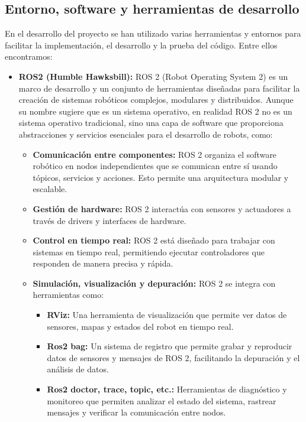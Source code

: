 \documentclass[12pt, a4paper, twoside]{article}
\begin{document}
\subsection{Entorno, software y herramientas de desarrollo}
  En el desarrollo del proyecto se han utilizado varias herramientas y entornos para facilitar la implementación, el desarrollo
  y la prueba del código. Entre ellos encontramos:
  \begin{itemize}
    \item
      \textbf{ROS2 (Humble Hawksbill):} ROS 2 (Robot Operating System 2) es un marco de desarrollo y un conjunto de herramientas 
      diseñadas para facilitar la creación de sistemas robóticos complejos, modulares y distribuidos. Aunque su nombre sugiere que es 
      un sistema operativo, en realidad ROS 2 no es un sistema operativo tradicional, sino una capa de software que proporciona 
      abstracciones y servicios esenciales para el desarrollo de robots, como:
      \begin{itemize}
        \item \textbf{Comunicación entre componentes:} ROS 2 organiza el software robótico en nodos independientes que se comunican 
        entre sí usando tópicos, servicios y acciones. Esto permite una arquitectura modular y escalable.
        \item \textbf{Gestión de hardware:} ROS 2 interactúa con sensores y actuadores a través de drivers y interfaces de hardware.
        \item \textbf{Control en tiempo real:} ROS 2 está diseñado para trabajar con sistemas en tiempo real, permitiendo ejecutar 
        controladores que responden de manera precisa y rápida. 
        \item \textbf{Simulación, visualización y depuración:} ROS 2 se integra con herramientas como:
        \begin{itemize}
        \item \textbf{RViz:} Una herramienta de visualización que permite ver datos de sensores, mapas y estados del robot en 
        tiempo real.
        \item \textbf{Ros2 bag:} Un sistema de registro que permite grabar y reproducir datos de sensores y mensajes de ROS 2, 
        facilitando la depuración y el análisis de datos.
        \item \textbf{Ros2 doctor, trace, topic, etc.:} Herramientas de diagnóstico y monitoreo que permiten analizar el estado 
        del sistema, rastrear mensajes y verificar la comunicación entre nodos.

\end{itemize}
\end{itemize}
\end{itemize}
\end{document}
